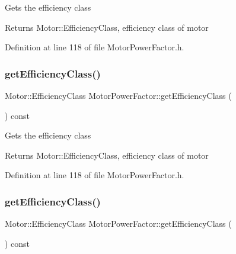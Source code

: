Gets the efficiency class \begin{DoxyReturn}{Returns}
Motor\+::\+Efficiency\+Class, efficiency class of motor 
\end{DoxyReturn}


Definition at line 118 of file Motor\+Power\+Factor.\+h.

\mbox{\label{class_motor_power_factor_a1ce98cb6ae9fbf09b05b4b6bd75e5c71}} 
\subsubsection{\texorpdfstring{get\+Efficiency\+Class()}{getEfficiencyClass()}\hspace{0.1cm}{\footnotesize\ttfamily [2/3]}}
{\footnotesize\ttfamily Motor\+::\+Efficiency\+Class Motor\+Power\+Factor\+::get\+Efficiency\+Class (\begin{DoxyParamCaption}{ }\end{DoxyParamCaption}) const\hspace{0.3cm}{\ttfamily [inline]}}

Gets the efficiency class \begin{DoxyReturn}{Returns}
Motor\+::\+Efficiency\+Class, efficiency class of motor 
\end{DoxyReturn}


Definition at line 118 of file Motor\+Power\+Factor.\+h.

\mbox{\label{class_motor_power_factor_a1ce98cb6ae9fbf09b05b4b6bd75e5c71}} 
\subsubsection{\texorpdfstring{get\+Efficiency\+Class()}{getEfficiencyClass()}\hspace{0.1cm}{\footnotesize\ttfamily [3/3]}}
{\footnotesize\ttfamily Motor\+::\+Efficiency\+Class Motor\+Power\+Factor\+::get\+Efficiency\+Class (\begin{DoxyParamCaption}{ }\end{DoxyParamCaption}) const\hspace{0.3cm}{\ttfamily [inline]}}

